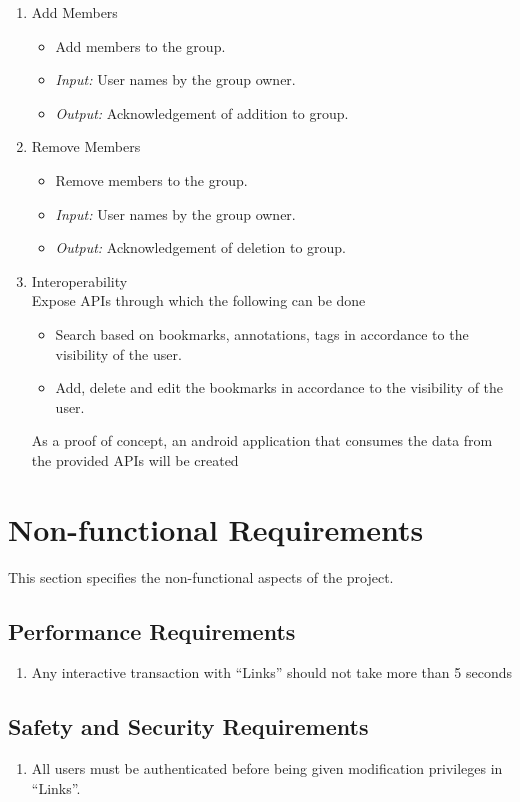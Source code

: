 \documentclass[11pt]{report} %
\begin{document}
\begin{enumerate}
	\item
		Add Members
		\begin{itemize}
			\item
				Add members to the group.
			\item
				\emph{Input:} User names by the group owner.
			\item
				\emph{Output:} Acknowledgement of addition to group.
		\end{itemize}


	\item
		Remove Members
		\begin{itemize}
			\item
				Remove members to the group.
			\item
				\emph{Input:} User names by the group owner.
			\item
				\emph{Output:} Acknowledgement of deletion to group.
		\end{itemize}
\item
Interoperability\\
Expose APIs through which the following can be done
\begin{itemize}
\item
Search based on bookmarks, annotations, tags in accordance to the visibility of the user.
\item
Add, delete and edit the bookmarks in accordance to the visibility of the user.
\end{itemize}
As a proof of concept, an android application that consumes the data from the provided APIs will be created
\end{enumerate}
\maketitle
\chapter{Non-functional Requirements}
This section specifies the non-functional aspects of the project.
\section{Performance Requirements}
\begin{enumerate}
\item
Any interactive transaction with “Links” should not take more than 5 seconds
\end{enumerate}
\section{Safety and Security Requirements}
\begin{enumerate}
\item
All users must be authenticated before being given modification privileges in “Links”.
\end{enumerate}
\end{document}
